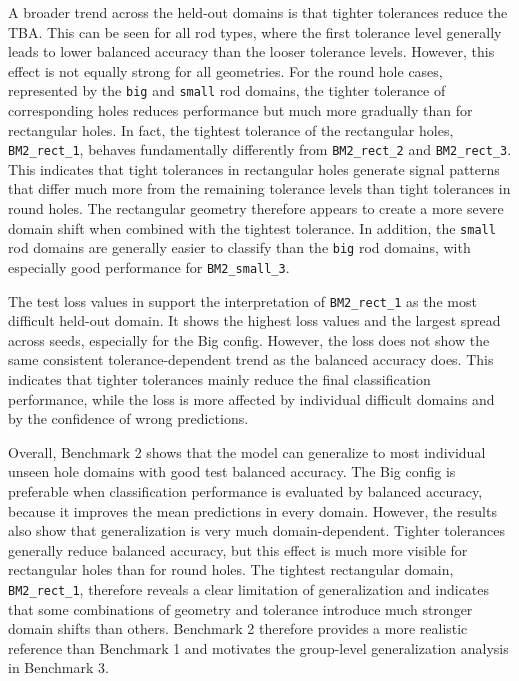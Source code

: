 A broader trend across the held-out domains is that tighter tolerances reduce the TBA. This can be seen for all rod types, where the first tolerance level generally leads to lower balanced accuracy than the looser tolerance levels. However, this effect is not equally strong for all geometries. For the round hole cases, represented by the \texttt{big} and \texttt{small} rod domains, the tighter tolerance of corresponding holes reduces performance but much more gradually than for rectangular holes. In fact, the tightest tolerance of the rectangular holes, \texttt{BM2\_rect\_1}, behaves fundamentally differently from \texttt{BM2\_rect\_2} and \texttt{BM2\_rect\_3}. This indicates that tight tolerances in rectangular holes generate signal patterns that differ much more from the remaining tolerance levels than tight tolerances in round holes. The rectangular geometry therefore appears to create a more severe domain shift when combined with the tightest tolerance. In addition, the \texttt{small} rod domains are generally easier to classify than the \texttt{big} rod domains, with especially good performance for \texttt{BM2\_small\_3}.

The test loss values in  support the interpretation of \texttt{BM2\_rect\_1} as the most difficult held-out domain. It shows the highest loss values and the largest spread across seeds, especially for the Big config. However, the loss does not show the same consistent tolerance-dependent trend as the balanced accuracy does. This indicates that tighter tolerances mainly reduce the final classification performance, while the loss is more affected by individual difficult domains and by the confidence of wrong predictions.

Overall, Benchmark 2 shows that the model can generalize to most individual unseen hole domains with good test balanced accuracy. The Big config is preferable when classification performance is evaluated by balanced accuracy, because it improves the mean predictions in every domain. However, the results also show that generalization is very much domain-dependent. Tighter tolerances generally reduce balanced accuracy, but this effect is much more visible for rectangular holes than for round holes. The tightest rectangular domain, \texttt{BM2\_rect\_1}, therefore reveals a clear limitation of generalization and indicates that some combinations of geometry and tolerance introduce much stronger domain shifts than others. Benchmark 2 therefore provides a more realistic reference than Benchmark 1 and motivates the group-level generalization analysis in Benchmark 3.


